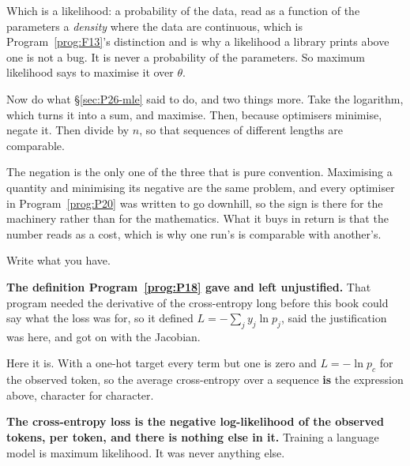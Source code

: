 \begin{fr}

Which is a likelihood: a probability of the data, read as a function of the
parameters \dash{} a \emph{density} where the data are continuous, which is
Program~\ref{prog:F13}'s distinction and is why a likelihood a library prints
above one is not a bug. It is never a probability of the parameters. So
maximum likelihood says to maximise it over $\theta$.

Now do what \S\ref{sec:P26-mle} said to do, and two things more. Take the
logarithm, which turns it into a sum, and maximise. Then, because optimisers
minimise, negate it. Then divide by $n$, so that sequences of different
lengths are comparable.

The negation is the only one of the three that is pure convention. Maximising
a quantity and minimising its negative are the same problem, and every
optimiser in Program~\ref{prog:P20} was written to go downhill, so the sign
is there for the machinery rather than for the mathematics. What it buys in
return is that the number reads as a cost, which is why one run's is
comparable with another's.

Write what you have.
\dotline
\nextframe
\end{fr}

\begin{fr}

\begin{note}
\textbf{The definition Program~\ref{prog:P18} gave and left unjustified.}
That program needed the derivative of the cross-entropy long before this
book could say what the loss was for, so it defined
$L = -\sum_j y_j \ln p_j$, said the justification was here, and got on with
the Jacobian.

Here it is. With a one-hot target every term but one is zero and
$L = -\ln p_c$ for the observed token, so the average cross-entropy over a
sequence \textbf{is} the expression above, character for character.

\textbf{The cross-entropy loss is the negative log-likelihood of the observed
tokens, per token, and there is nothing else in it.} Training a language
model is maximum likelihood. It was never anything else.
\end{note}
\end{fr}

